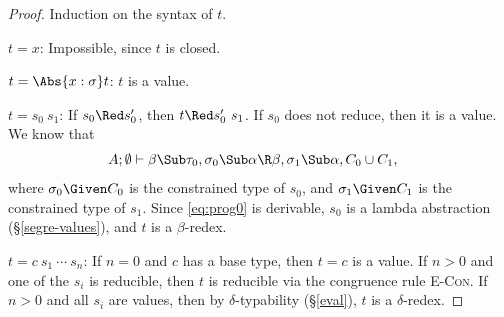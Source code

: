 \documentclass{amsart}
\theoremstyle{definition}
\begin{document}
\begin{proof}
Induction on the syntax of $t$.

\Case$t=x$: Impossible, since $t$ is closed.

\Case$t=\Abs{x:\sigma}t$: $t$ is a value.

\Case$t=s_0~s_1$: If $s_0\Red s_0'$, then $t\Red s_0'~s_1$. If
$s_0$ does not reduce, then it is a value. We know that
\begin{align}
A;\emptyset&\vdash \beta\Sub\tau_0,
\sigma_0\Sub\alpha\R\beta,\sigma_1\Sub\alpha,C_0\cup C_1,
\label{eq:prog0}
\end{align}
where $\sigma_0\Given C_0$ is the constrained type of $s_0$, and
$\sigma_1\Given C_1$ is the constrained type of $s_1$. Since
\eqref{eq:prog0} is derivable, $s_0$ is a lambda abstraction
(\S\ref{segre-values}), and $t$ is a $\beta$-redex.

\Case$t=c~s_1~\cdots~s_n$: If $n=0$ and $c$ has a base type, then
$t=c$ is a value. If $n>0$ and one of the $s_i$ is reducible,
then $t$ is reducible via the congruence rule \textsc{E-Con}. If
$n>0$ and all $s_i$ are values, then by $\delta$-typability
(\S\ref{eval}), $t$ is a $\delta$-redex.
\end{proof}


\end{document}
